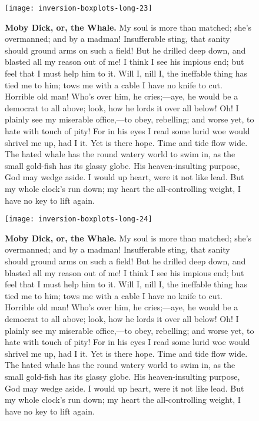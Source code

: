 \documentclass{article}
\begin{document}
\begin{figure}[!htp]
  \begin{center}
      \texttt{[image: inversion-boxplots-long-23]}
    \caption{
        \textbf{Moby Dick, or, the Whale.}
My soul is more than matched; she's overmanned; and by a madman! Insufferable sting, that sanity should ground arms on such a field! But he drilled deep down, and blasted all my reason out of me! I think I see his impious end; but feel that I must help him to it. Will I, nill I, the ineffable thing has tied me to him; tows me with a cable I have no knife to cut. Horrible old man! Who's over him, he cries;—aye, he would be a democrat to all above; look, how he lords it over all below! Oh! I plainly see my miserable office,—to obey, rebelling; and worse yet, to hate with touch of pity! For in his eyes I read some lurid woe would shrivel me up, had I it. Yet is there hope. Time and tide flow wide. The hated whale has the round watery world to swim in, as the small gold-fish has its glassy globe. His heaven-insulting purpose, God may wedge aside. I would up heart, were it not like lead. But my whole clock's run down; my heart the all-controlling weight, I have no key to lift again. 
    }
  \end{center}
\end{figure}

\begin{figure}[!htp]
  \begin{center}
      \texttt{[image: inversion-boxplots-long-24]}
    \caption{
        \textbf{Moby Dick, or, the Whale.}
My soul is more than matched; she's overmanned; and by a madman! Insufferable sting, that sanity should ground arms on such a field! But he drilled deep down, and blasted all my reason out of me! I think I see his impious end; but feel that I must help him to it. Will I, nill I, the ineffable thing has tied me to him; tows me with a cable I have no knife to cut. Horrible old man! Who's over him, he cries;—aye, he would be a democrat to all above; look, how he lords it over all below! Oh! I plainly see my miserable office,—to obey, rebelling; and worse yet, to hate with touch of pity! For in his eyes I read some lurid woe would shrivel me up, had I it. Yet is there hope. Time and tide flow wide. The hated whale has the round watery world to swim in, as the small gold-fish has its glassy globe. His heaven-insulting purpose, God may wedge aside. I would up heart, were it not like lead. But my whole clock's run down; my heart the all-controlling weight, I have no key to lift again. 
    }
  \end{center}
\end{figure}
\end{document}
